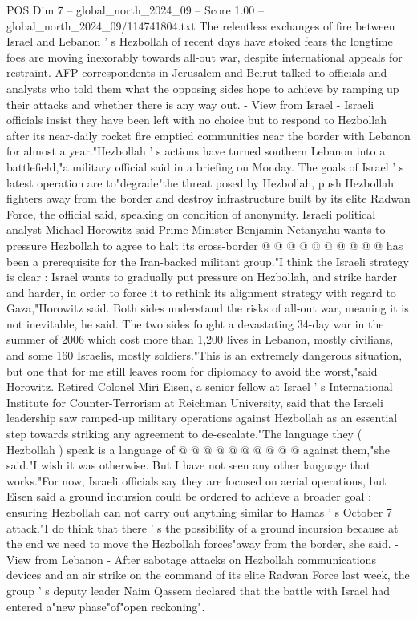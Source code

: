 \begin{textsample}{POS Dim 7 – global\_north\_2024\_09 – Score 1.00 – global\_north\_2024\_09/114741804.txt}  \label{ex:f7_pos_438}
The relentless exchanges of fire between Israel and Lebanon ' s Hezbollah of recent days have stoked fears the longtime foes are moving inexorably towards all-out war, despite international appeals for restraint.
AFP correspondents in Jerusalem and Beirut talked to officials and analysts who told them what the opposing sides hope to achieve by ramping up their attacks and whether there is any way out. - View from Israel - Israeli officials insist they have been left with no choice but to respond to Hezbollah after its near-daily rocket fire emptied communities near the border with Lebanon for almost a year."Hezbollah ' s actions have turned southern Lebanon into a battlefield,"a military official said in a briefing on Monday.
The goals of Israel ' s latest operation are to"degrade"the threat posed by Hezbollah, push Hezbollah fighters away from the border and destroy infrastructure built by its elite Radwan Force, the official said, speaking on condition of anonymity.
Israeli political analyst Michael Horowitz said Prime Minister Benjamin Netanyahu wants to pressure Hezbollah to agree to halt its cross-border @ @ @ @ @ @ @ @ @ @ has been a prerequisite for the Iran-backed militant group."I think the Israeli strategy is clear : Israel wants to gradually put pressure on Hezbollah, and strike harder and harder, in order to force it to rethink its alignment strategy with regard to Gaza,"Horowitz said.
Both sides understand the risks of all-out war, meaning it is not inevitable, he said.
The two sides fought a devastating 34-day war in the summer of 2006 which cost more than 1,200 lives in Lebanon, mostly civilians, and some 160 Israelis, mostly soldiers."This is an extremely dangerous situation, but one that for me still leaves room for diplomacy to avoid the worst,"said Horowitz.
Retired Colonel Miri Eisen, a senior fellow at Israel ' s International Institute for Counter-Terrorism at Reichman University, said that the Israeli leadership saw ramped-up military operations against Hezbollah as an essential step towards striking any agreement to de-escalate."The language they ( Hezbollah ) speak is a language of @ @ @ @ @ @ @ @ @ @ against them,"she said."I wish it was otherwise.
But I have not seen any other language that works."For now, Israeli officials say they are focused on aerial operations, but Eisen said a ground incursion could be ordered to achieve a broader goal : ensuring Hezbollah can not carry out anything similar to Hamas ' s October 7 attack."I do think that there ' s the possibility of a ground incursion because at the end we need to move the Hezbollah forces"away from the border, she said. - View from Lebanon - After sabotage attacks on Hezbollah communications devices and an air strike on the command of its elite Radwan Force last week, the group ' s deputy leader Naim Qassem declared that the battle with Israel had entered a"new phase"of"open reckoning".

\end{textsample}
